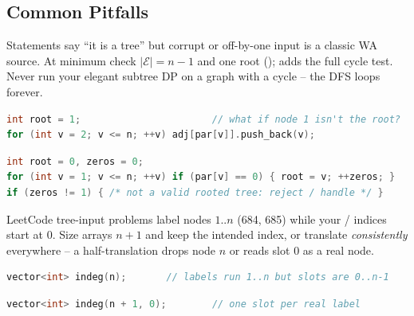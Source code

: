 \subsection{Common Pitfalls}\label{sec:c25-parent-pitfalls}

\begin{warningbox}
Statements say ``it is a tree'' but corrupt or off-by-one input is a classic WA source. At minimum
check $|\mathcal{E}|=n-1$ and one root ();  adds the full
cycle test. Never run your elegant subtree DP on a graph with a cycle -- the DFS loops forever.
\end{warningbox}
\begin{lstlisting}[caption={\textcolor{warningred}{WRONG}: assume the array is a valid tree, root hard-coded}, language=C++, basicstyle=\ttfamily\small]
int root = 1;                       // what if node 1 isn't the root?
for (int v = 2; v <= n; ++v) adj[par[v]].push_back(v);
\end{lstlisting}
\begin{lstlisting}[caption={\textcolor{successgreen}{RIGHT}: detect the root and validate}, language=C++, basicstyle=\ttfamily\small]
int root = 0, zeros = 0;
for (int v = 1; v <= n; ++v) if (par[v] == 0) { root = v; ++zeros; }
if (zeros != 1) { /* not a valid rooted tree: reject / handle */ }
\end{lstlisting}

\begin{warningbox}
LeetCode tree-input problems label nodes $1..n$ (684, 685) while your /
indices start at $0$. Size arrays $n+1$ and keep the intended index, or translate \emph{consistently}
everywhere -- a half-translation drops node $n$ or reads slot $0$ as a real node.
\end{warningbox}
\begin{lstlisting}[caption={\textcolor{warningred}{WRONG}: $n$-sized array on $1..n$ labels -- index $n$ out of range}, language=C++, basicstyle=\ttfamily\small]
vector<int> indeg(n);       // labels run 1..n but slots are 0..n-1
\end{lstlisting}
\begin{lstlisting}[caption={\textcolor{successgreen}{RIGHT}: size $n+1$, ignore slot $0$}, language=C++, basicstyle=\ttfamily\small]
vector<int> indeg(n + 1, 0);        // one slot per real label
\end{lstlisting}

